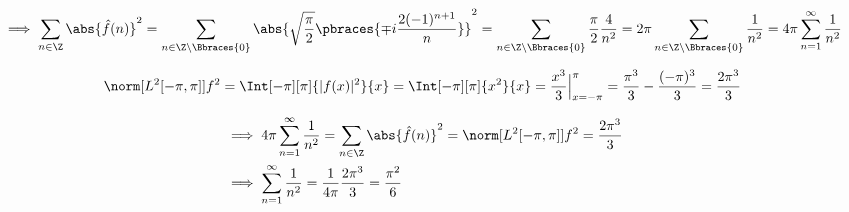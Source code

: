 \begin{solution}
\begin{enumerate}[label = \arabic*.]
    \begin{align*}
        \implies
        \sum_{n \in \Z}
        \abs{\hat f(n)}^2
        =
        \sum_{n \in \Z \setminus \Bbraces{0}}
        \abs
        {
            \sqrt \frac{\pi}{2}
            \pbraces
            {
                \mp i
                \frac{2 (-1)^{n+1}}{n}
            }            
        }^2
        =
        \sum_{n \in \Z \setminus \Bbraces{0}}
        \frac{\pi}{2}
        \frac{4}{n^2}
        =
        2 \pi
        \sum_{n \in \Z \setminus \Bbraces{0}}
        \frac{1}{n^2}
        =
        4 \pi
        \sum_{n=1}^\infty
        \frac{1}{n^2}
    \end{align*}

    \begin{align*}
        \norm[{L^2[-\pi, \pi]}]{f}^2
        =
        \Int[-\pi][\pi]{|f(x)|^2}{x}
        =
        \Int[-\pi][\pi]{x^2}{x}
        =
        \frac{x^3}{3} \Big |_{x = -\pi}^\pi
        =
        \frac{\pi^3}{3} - \frac{(-\pi)^3}{3}
        =
        \frac{2 \pi^3}{3}
    \end{align*}

    \begin{align*}
        & \implies
        4 \pi
        \sum_{n=1}^\infty
        \frac{1}{n^2}
        =
        \sum_{n \in \Z}
        \abs{\hat f(n)}^2
        =
        \norm[{L^2[-\pi, \pi]}]{f}^2
        =
        \frac{2 \pi^3}{3} \\
        & \implies
        \sum_{n=1}^\infty
        \frac{1}{n^2}
        =
        \frac{1}{4 \pi}
        \frac{2 \pi^3}{3}
        =
        \frac{\pi^2}{6}
    \end{align*}

\end{enumerate}

\end{solution}

